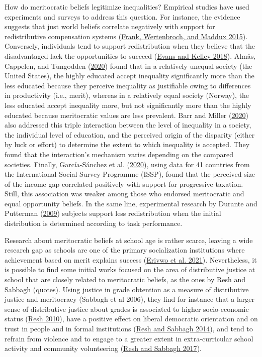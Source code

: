 \documentclass[
  letterpaper,
  DIV=11,
  numbers=noendperiod]{scrartcl}
\begin{document}
How do meritocratic beliefs legitimize inequalities? Empirical studies
have used experiments and surveys to address this question. For
instance, the evidence suggests that just world beliefs correlate
negatively with support for redistributive compensation systems
(\protect\hyperlink{ref-frank_performance_2015}{Frank, Wertenbroch, and
Maddux 2015}). Conversely, individuals tend to support redistribution
when they believe that the disadvantaged lack the opportunities to
succeed (\protect\hyperlink{ref-evans_strong_2018}{Evans and Kelley
2018}). Almås, Cappelen, and Tungodden
(\protect\hyperlink{ref-almas_cutthroat_2020}{2020}) found that in a
relatively unequal society (the United States), the highly educated
accept inequality significantly more than the less educated because they
perceive inequality as justifiable owing to differences in productivity
(i.e., merit), whereas in a relatively equal society (Norway), the less
educated accept inequality more, but not significantly more than the
highly educated because meritocratic values are less prevalent. Barr and
Miller (\protect\hyperlink{ref-barr_effect_2020}{2020}) also addressed
this triple interaction between the level of inequality in a society,
the individual level of education, and the perceived origin of the
disparity (either by luck or effort) to determine the extent to which
inequality is accepted. They found that the interaction's mechanism
varies depending on the compared societies. Finally, García-Sánchez et
al. (\protect\hyperlink{ref-garcia-sanchez_attitudes_2020}{2020}), using
data for 41 countries from the International Social Survey Programme
(ISSP), found that the perceived size of the income gap correlated
positively with support for progressive taxation. Still, this
association was weaker among those who endorsed meritocratic and equal
opportunity beliefs. In the same line, experimental research by Durante
and Putterman (\protect\hyperlink{ref-durante_preferences_2009}{2009})
subjects support less redistribution when the initial distribution is
determined according to task performance.

Research about meritocratic beliefs at school age is rather scarce,
leaving a wide research gap as schools are one of the primary
socialization institutions where achievement based on merit explains
success (\protect\hyperlink{ref-erivwo_meritocracy_2021}{Erivwo et al.
2021}). Nevertheless, it is possible to find some initial works focused
on the area of distributive justice at school that are closely related
to meritocratic beliefs, as the ones by Resh and Sabbagh (quotes). Using
justice in grade obtention as a measure of distributive justice and
meritocracy (Sabbagh et al 2006), they find for instance that a larger
sense of distributive justice about grades is associated to higher
socio-economic status (\protect\hyperlink{ref-resh_sense_2010}{Resh
2010}), have a positive effect on liberal democratic orientation and on
trust in people and in formal institutions
(\protect\hyperlink{ref-resh_sense_2014}{Resh and Sabbagh 2014}), and
tend to refrain from violence and to engage to a greater extent in
extra-curricular school activity and community volunteering
(\protect\hyperlink{ref-resh_sense_2017}{Resh and Sabbagh 2017}).
\end{document}
